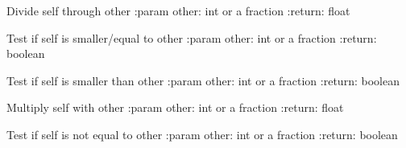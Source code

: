 \documentclass[letterpaper,10pt,english]{sphinxmanual}
\begin{document}
\begin{fulllineitems}
\begin{fulllineitems}
\end{fulllineitems}


\begin{fulllineitems}
\label{bruch:bruch.Bruch.__itruediv__}
Divide self through other
:param other: int or a fraction
:return: float

\end{fulllineitems}


\begin{fulllineitems}
\label{bruch:bruch.Bruch.__le__}
Test if self is smaller/equal to other
:param other: int or a fraction
:return: boolean

\end{fulllineitems}


\begin{fulllineitems}
\label{bruch:bruch.Bruch.__lt__}
Test if self is smaller than other
:param other: int or a fraction
:return: boolean

\end{fulllineitems}


\begin{fulllineitems}
\label{bruch:bruch.Bruch.__module__}
\end{fulllineitems}


\begin{fulllineitems}
\label{bruch:bruch.Bruch.__mul__}
Multiply self with other
:param other: int or a fraction
:return: float

\end{fulllineitems}


\begin{fulllineitems}
\label{bruch:bruch.Bruch.__ne__}
Test if self is not equal to other
:param other: int or a fraction
:return: boolean


\end{fulllineitems}
\end{fulllineitems}
\end{document}
